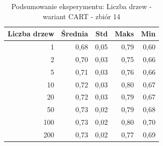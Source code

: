 \begin{table}[htbp]
\centering
\small
\setlength{\tabcolsep}{6pt}
\renewcommand{\arraystretch}{1.2}
\caption{Podsumowanie eksperymentu: Liczba drzew - wariant CART - zbiór 14}
\label{tab:CART_tree_count_14}
\begin{tabular}{r|r|r|r|r}
\toprule
Liczba drzew & Średnia & Std & Maks & Min \\
\hline
1 & 0,68 & 0,05 & 0,79 & 0,60 \\
2 & 0,70 & 0,03 & 0,75 & 0,66 \\
5 & 0,71 & 0,03 & 0,76 & 0,66 \\
10 & 0,72 & 0,03 & 0,80 & 0,67 \\
20 & 0,72 & 0,03 & 0,79 & 0,67 \\
50 & 0,73 & 0,02 & 0,79 & 0,68 \\
100 & 0,73 & 0,02 & 0,80 & 0,70 \\
200 & 0,73 & 0,02 & 0,77 & 0,69 \\
\bottomrule
\end{tabular}
\end{table}
